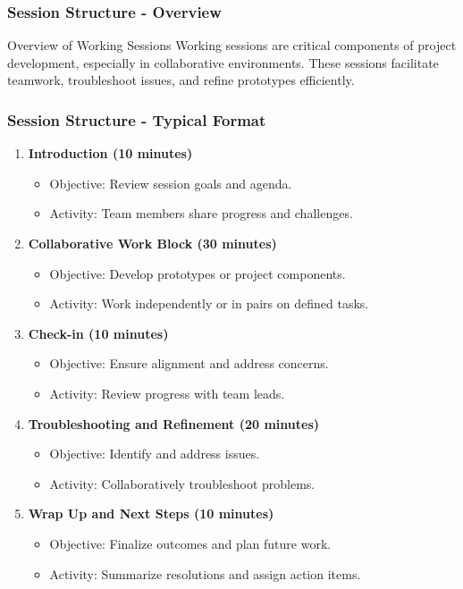 \documentclass[aspectratio=169]{beamer}
\begin{document}
\begin{frame}[fragile]
    \frametitle{Session Structure - Overview}
    \begin{block}{Overview of Working Sessions}
        Working sessions are critical components of project development, especially in collaborative environments. 
        These sessions facilitate teamwork, troubleshoot issues, and refine prototypes efficiently.
    \end{block}
\end{frame}

\begin{frame}[fragile]
    \frametitle{Session Structure - Typical Format}
    \begin{enumerate}
        \item \textbf{Introduction (10 minutes)}
        \begin{itemize}
            \item Objective: Review session goals and agenda.
            \item Activity: Team members share progress and challenges.
        \end{itemize}
        
        \item \textbf{Collaborative Work Block (30 minutes)}
        \begin{itemize}
            \item Objective: Develop prototypes or project components.
            \item Activity: Work independently or in pairs on defined tasks.
        \end{itemize}
        
        \item \textbf{Check-in (10 minutes)}
        \begin{itemize}
            \item Objective: Ensure alignment and address concerns.
            \item Activity: Review progress with team leads.
        \end{itemize}
        
        \item \textbf{Troubleshooting and Refinement (20 minutes)}
        \begin{itemize}
            \item Objective: Identify and address issues.
            \item Activity: Collaboratively troubleshoot problems.
        \end{itemize}
        
        \item \textbf{Wrap Up and Next Steps (10 minutes)}
        \begin{itemize}
            \item Objective: Finalize outcomes and plan future work.
            \item Activity: Summarize resolutions and assign action items.
        \end{itemize}
    \end{enumerate}
\end{frame}
\end{document}
